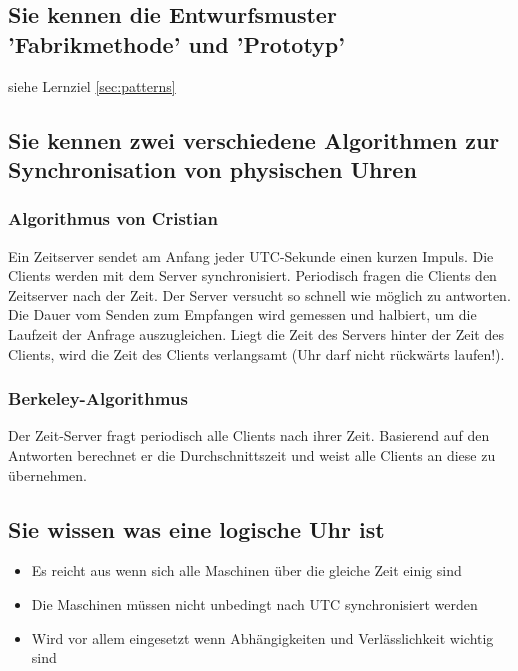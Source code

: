 \subsection{Sie kennen die Entwurfsmuster 'Fabrikmethode' und 'Prototyp'}

siehe Lernziel \ref{sec:patterns}

\subsection{Sie kennen zwei verschiedene Algorithmen zur Synchronisation von physischen Uhren}

\subsubsection{Algorithmus von Cristian}

Ein Zeitserver sendet am Anfang jeder UTC-Sekunde einen kurzen Impuls. Die Clients werden mit dem Server synchronisiert. Periodisch fragen die Clients den Zeitserver nach der Zeit. Der Server versucht so schnell wie möglich zu antworten. Die Dauer vom Senden zum Empfangen wird gemessen und halbiert, um die Laufzeit der Anfrage auszugleichen. Liegt die Zeit des Servers hinter der Zeit des Clients, wird die Zeit des Clients verlangsamt (Uhr darf nicht rückwärts laufen!).

\subsubsection{Berkeley-Algorithmus}

Der Zeit-Server fragt periodisch alle Clients nach ihrer Zeit. Basierend auf den Antworten berechnet er die Durchschnittszeit und weist alle Clients an diese zu übernehmen.

\subsection{Sie wissen was eine logische Uhr ist}

\begin{itemize}
	\item Es reicht aus wenn sich alle Maschinen über die gleiche Zeit einig sind
	\item Die Maschinen müssen nicht unbedingt nach UTC synchronisiert werden
	\item Wird vor allem eingesetzt wenn Abhängigkeiten und Verlässlichkeit wichtig sind
\end{itemize}

